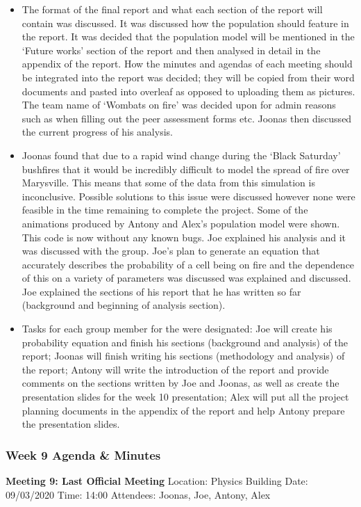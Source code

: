 \begin{itemize}
    \item The format of the final report and what each section of the report will contain was discussed. It was discussed how the population should feature in the report. It was decided that the population model will be mentioned in the ‘Future works’ section of the report and then analysed in detail in the appendix of the report. How the minutes and agendas of each meeting should be integrated into the report was decided; they will be copied from their word documents and pasted into overleaf as opposed to uploading them as pictures.  The team name of ‘Wombats on fire’ was decided upon for admin reasons such as when filling out the peer assessment forms etc. Joonas then discussed the current progress of his analysis.\newline
    \item Joonas found that due to a rapid wind change during the ‘Black Saturday’ bushfires that it would be incredibly difficult to model the spread of fire over Marysville. This means that some of the data from this simulation is inconclusive. Possible solutions to this issue were discussed however none were feasible in the time remaining to complete the project. Some of the animations produced by Antony and Alex’s population model were shown. This code is now without any known bugs. Joe explained his analysis and it was discussed with the group. Joe’s plan to generate an equation that accurately describes the probability of a cell being on fire and the dependence of this on a variety of parameters was discussed was explained and discussed. Joe explained the sections of his report that he has written so far (background and beginning of analysis section). \newline 
    \item Tasks for each group member for the were designated: Joe will create his probability equation and finish his sections (background and analysis) of the report; Joonas will finish writing his sections (methodology and analysis) of the report; Antony will write the introduction of the report and provide comments on the sections written by Joe and Joonas, as well as  create the presentation slides for the week 10 presentation; Alex will put all the project planning documents in the appendix of the report and help Antony prepare the presentation slides.
\end{itemize}

\subsubsection*{Week 9 Agenda \& Minutes}
\textbf{Meeting 9: Last Official Meeting}\newline
Location: Physics Building\newline
Date: 09/03/2020\newline
Time: 14:00\newline
Attendees: Joonas, Joe, Antony, Alex


